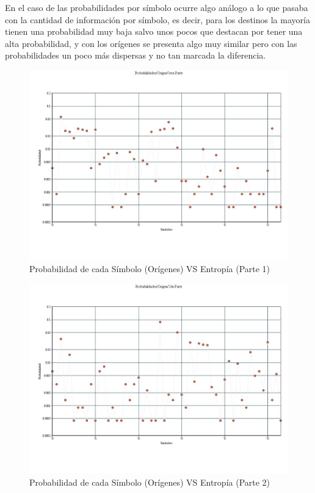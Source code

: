 En el caso de las probabilidades por símbolo ocurre algo análogo a lo que pasaba con la cantidad de información por símbolo, es decir, para los destinos la mayoría tienen una probabilidad muy baja salvo unos pocos que destacan por tener una alta probabilidad, y con los orígenes se presenta algo muy similar pero con las probabilidades un poco más dispersas y no tan marcada la diferencia.

\begin{figure}[H]
  \centering
    \includegraphics[scale=0.45]{imagenes/graficos/Probabilidades/02origen1eraParte.jpg}
  \caption{Probabilidad de cada Símbolo (Orígenes) VS Entropía (Parte 1)}
  \label{fig:7}
\end{figure}

\begin{figure}[H]
  \centering
    \includegraphics[scale=0.45]{imagenes/graficos/Probabilidades/02origen2daParte.jpg}
  \caption{Probabilidad de cada Símbolo (Orígenes) VS Entropía (Parte 2)}
  \label{fig:8}
\end{figure}

